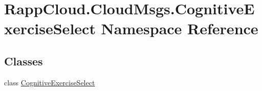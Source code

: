\hypertarget{namespaceRappCloud_1_1CloudMsgs_1_1CognitiveExerciseSelect}{\section{Rapp\-Cloud.\-Cloud\-Msgs.\-Cognitive\-Exercise\-Select Namespace Reference}
\label{namespaceRappCloud_1_1CloudMsgs_1_1CognitiveExerciseSelect}
}
\subsection*{Classes}
\begin{DoxyCompactItemize}
\item 
class \hyperlink{classRappCloud_1_1CloudMsgs_1_1CognitiveExerciseSelect_1_1CognitiveExerciseSelect}{Cognitive\-Exercise\-Select}
\end{DoxyCompactItemize}
